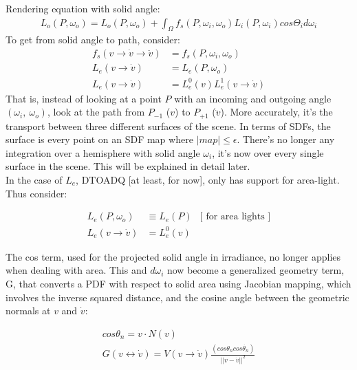 \documentclass{article}
\begin{document}
    Rendering equation with solid angle:
  \begin{align}
    L_o(P, \omega_o) = L_o(P, \omega_o) + \int_{\Omega}f_s(P, \omega_i,
    \omega_o) L_i(P, \omega_i) cos\Theta_i d\omega_i
  \end{align}
    To get from solid angle to path, consider:
  \begin{align}
    f_s(v \rightarrow \dot{v} \rightarrow \ddot{v}) &= f_s(P, \omega_i,
                                                      \omega_o)\\
    L_e(v \rightarrow \dot{v}) &= L_e(P, \omega_o)\\
    L_e(v \rightarrow \dot{v}) &= L_e^0(v) L_e^1(v \rightarrow \dot{v})
  \end{align}
    That is, instead of looking at a point $P$ with an incoming and outgoing
    angle $(\omega_i,\:\omega_o)$, look at the path from $P_{-1}$ ($v$) to
    $P_{+1}$ ($\ddot{v}$). More accurately, it's the transport between
    three different surfaces of the scene. In terms of SDFs, the surface
    is every point on an SDF map where $|map| \leq \epsilon$. There's no longer
    any integration over a hemisphere with solid angle $\omega_i$, it's now over
    every single surface in the scene. This will be explained in detail later.
\\
    In the case of $L_e$,
    DTOADQ [at least, for now], only has support for area-light. Thus consider:

  \begin{align}
    L_e(P, \omega_o) &\equiv L_e(P) &\text{[ for area lights ]}\\
    L_e(v \rightarrow \dot{v}) &= L_e^0(v)&
  \end{align}

    The cos term, used for the projected solid angle in irradiance, no longer
    applies when dealing with area. This and $d\omega_i$ now become a
    generalized geometry term, G, that converts a PDF with respect to solid area
    using Jacobian mapping, which involves the inverse squared distance, and the
    cosine angle between the geometric normals at $v$ and $\dot{v}$:

  \begin{align}
    cos\theta_n = v \cdot N(v) \\
    G(v \leftrightarrow \dot{v}) = V(v \rightarrow \dot{v})
        \frac{(cos\theta_n cos\dot{\theta_n})}{|| v - \dot{v}||^2}
  \end{align}
\end{document}
